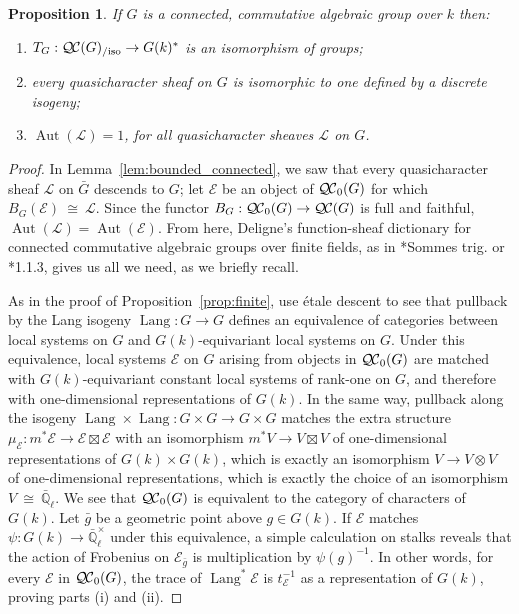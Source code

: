 \documentclass[10pt]{amsart}
\theoremstyle{plain}
\newtheorem{proposition}[theorem]{Proposition}
\theoremstyle{definition}
\theoremstyle{remark}
\newcommand{\EE}{\mathbb{\bar Q}_\ell}
\newcommand{\Fq}{k}
\newcommand{\EEx}{\EE^\times}
\DeclareMathOperator{\Aut}{Aut}
\DeclareMathOperator{\Lang}{Lang}
\newcommand{\iso}{{\ \cong\ }}
\newcommand{\trFrob}[1]{t_{#1}}
\newcommand{\TrFrob}[1]{T_{#1}}
\newcommand{\qcs}[1]{{\mathcal{#1}}}
\newcommand{\QC}{{\mathcal{Q\hskip-0.8pt C}}}
\newcommand{\bQC}{{\QC_0}}
\newcommand{\QCiso}[1]{\QC(#1)_{/\text{iso}}}
\newcommand{\bg}{\bar{g}}
\newcommand{\bG}{\bar{G}}
\begin{document}
\begin{proposition}\label{prop:connected}
 If $G$ is a connected, commutative algebraic group over $\Fq$ then:
 \begin{enumerate}
 \item $\TrFrob{G} : \QCiso{G} \to G(\Fq)^*$ is an isomorphism of groups;
 \item every quasicharacter sheaf on $G$ is isomorphic to one defined by a discrete isogeny;
 \item $\Aut(\qcs{L}) = 1$, for all quasicharacter sheaves $\qcs{L}$ on $G$.
 \end{enumerate}
 \end{proposition}
\begin{proof}
In Lemma~\ref{lem:bounded_connected}, we saw that every quasicharacter sheaf $\qcs{L}$ on $\bG$ descends to $G$; let $\qcs{E}$ be an object of $\bQC(G)$ for which $B_G(\qcs{E}) \iso \qcs{L}$.
 Since the functor $B_G : \bQC(G) \to \QC(G)$ is full and faithful, $\Aut(\qcs{L}) = \Aut(\qcs{E})$.
From here, Deligne's function-sheaf dictionary for connected commutative algebraic groups over finite fields, as in \cite{deligne:SGA4.5}*{Sommes trig.} or \cite{laumon:87a}*{1.1.3}, gives us all we need, as we briefly recall. %

As in the proof of Proposition~\ref{prop:finite}, use \'etale descent to see that pullback by the Lang isogeny $\Lang : G\to G$ defines an equivalence of categories between local systems on $G$ and $G(\Fq)$-equivariant local systems on $G$. 
Under this equivalence, local systems $\qcs{E}$ on $G$ arising from objects in $\bQC(G)$ are matched with $G(\Fq)$-equivariant constant local systems of rank-one on $G$, and therefore with one-dimensional representations of $G(\Fq)$. 
In the same way, pullback along the isogeny $\Lang\times\Lang : G\times G\to G\times G$ matches the extra structure $\mu_\qcs{E} : m^*\qcs{E} \to \qcs{E}\boxtimes\qcs{E}$ with an isomorphism $m^*V \to V\boxtimes V$ of one-dimensional representations of $G(\Fq)\times G(\Fq)$, which is exactly an isomorphism $V \to V\otimes V$ of one-dimensional representations, which is exactly the choice of an isomorphism $V\iso \EE$.
We see that $\bQC(G)$ is equivalent to the category of characters of $G(\Fq)$.
Let $\bg$ be a geometric point above $g \in G(\Fq)$.  If $\qcs{E}$ matches $\psi : G(\Fq)\to \EEx$ under this equivalence, a simple calculation on stalks reveals that the action of Frobenius on $\qcs{E}_{\bar g}$ is multiplication by $\psi(g)^{-1}$.
In other words, for every $\qcs{E}$ in $\bQC(G)$, the trace of $\Lang^*\qcs{E}$ is $\trFrob{\qcs{E}}^{-1}$ as a representation of $G(\Fq)$, proving parts (i) and (ii).


\end{proof}
\end{document}
